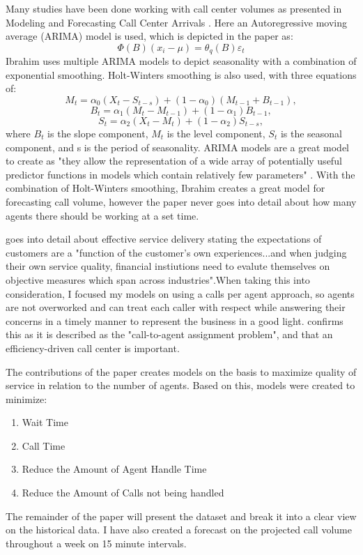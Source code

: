 \documentclass[12pt]{article}
\begin{document}
  Many studies have been done working with call center volumes as presented in Modeling and Forecasting Call Center Arrivals \citep{ibrahim2016modeling}.
Here an Autoregressive moving average (ARIMA) model is used, which is depicted in the paper as:
\begin{equation}
  \label{eq:ARIMA Standard}
  \Phi(B)(x_i -\mu)=\theta_q(B)\varepsilon_t
\end{equation}
Ibrahim uses multiple ARIMA models to depict seasonality with a combination of exponential smoothing. Holt-Winters smoothing is also used,
with three equations of:
\begin{equation}
  \label{eq:Holt-Winters}
  M_t=\alpha_0(X_t-S_{t-s}) + (1-\alpha_0)(M_{t-1}+B_{t-1}),
\end{equation}
\begin{equation}
  \label{eq:Holt-Winters2}
  B_t=\alpha_1(M_t-M_{t-1}) +(1-\alpha_1)B_{t-1},
\end{equation}
\begin{equation}
  \label{eq:Holt-Winters3}
  S_t=\alpha_2(X_t-M_t) +(1-\alpha_2)S_{t-s},
\end{equation}
where $B_{t}$ is the slope component, $M_{t}$ is the level component, $S_{t}$ is the seasonal component, and s is the period of seasonality.
ARIMA models are a great model to create as "they allow the  representation of a  wide array of potentially useful predictor functions in  models  which contain relatively few parameters" \citep{newbold1983arima}.
With the combination of Holt-Winters smoothing, Ibrahim creates a great model for forecasting call volume, however the paper never goes into detail about
how many agents there should be working at a set time. 

  \citep{evensen1999effective} goes into detail about effective service delivery stating the expectations of customers are a "function of
the customer's own experiences...and when judging their own service quality, financial instiutions need to evalute themselves on 
objective measures which span across industries".When taking this into consideration, I focused my models on using a calls per agent approach,
so agents are not overworked and can treat each caller with respect while answering their concerns in a timely manner to represent the business in a good light. \citep{avramidis2005modeling} confirms
this as it is described as the "call-to-agent assignment problem", and that an efficiency-driven call center is important.


  The contributions of the paper creates models on the basis to maximize quality of service in relation to the number of agents. 
Based on this, models were created to minimize:
\begin{enumerate}
  \item Wait Time
  \item Call Time
  \item Reduce the Amount of Agent Handle Time
  \item Reduce the Amount of Calls not being handled
\end{enumerate}
The remainder of the paper will present the dataset and break it into a clear view on the historical data. I have also created a 
forecast on the projected call volume throughout a week on 15 minute intervals.
\end{document}
